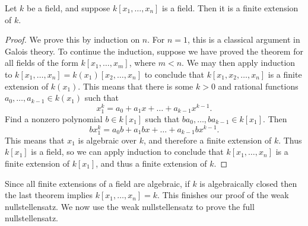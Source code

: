\begin{lemma}
    Let $k$ be a field, and suppose $k[x_1, \dots, x_n]$ is a field. Then it is a finite extension of $k$.
\end{lemma}
\begin{proof}
    We prove this by induction on $n$. For $n = 1$, this is a classical argument in Galois theory. To continue the induction, suppose we have proved the theorem for all fields of the form $k[x_1, \dots, x_m]$, where $m < n$. We may then apply induction to $k[x_1, \dots, x_n] = k(x_1)[x_2, \dots, x_n]$ to conclude that $k[x_1, x_2, \dots, x_n]$ is a finite extension of $k(x_1)$. This means that there is some $k > 0$ and rational functions $a_0,\dots,a_{k-1} \in k(x_1)$ such that
    \[ x_1^k = a_0 + a_1 x + \dots + a_{k-1} x^{k-1}. \]
    Find a nonzero polynomial $b \in k[x_1]$ such that $ba_0,\dots,ba_{k-1} \in k[x_1]$. Then
    \[ b x_1^k = a_0 b + a_1 b x + \dots + a_{k-1} b x^{k-1}. \]
    This means that $x_1$ is algebraic over $k$, and therefore a finite extension of $k$. Thus $k[x_1]$ is a field, so we can apply induction to conclude that $k[x_1,\dots,x_n]$ is a finite extension of $k[x_1]$, and thus a finite extension of $k$.
\end{proof}

Since all finite extensions of a field are algebraic, if $k$ is algebraically closed then the last theorem implies $k[x_1,\dots,x_n] = k$. This finishes our proof of the weak nullstellensatz. We now use the weak nullstellensatz to prove the full nullstellensatz.

